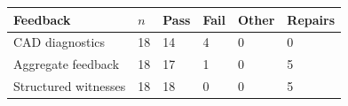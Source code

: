 \begin{tabular}{llllll}
\toprule
Feedback & $n$ & Pass & Fail & Other & Repairs \\
\midrule
CAD diagnostics & 18 & 14 & 4 & 0 & 0 \\
Aggregate feedback & 18 & 17 & 1 & 0 & 5 \\
Structured witnesses & 18 & 18 & 0 & 0 & 5 \\
\bottomrule
\end{tabular}
